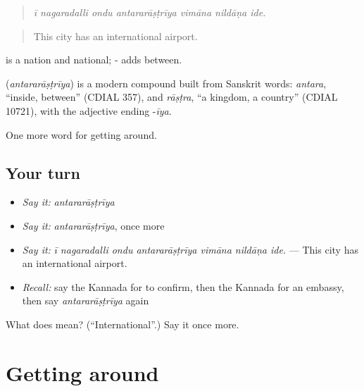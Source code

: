 \begin{quote}
\emph{ī nagaradalli ondu antararāṣṭrīya vimāna nildāṇa ide.}
\end{quote}

\begin{quote}
This city has an international airport.
\end{quote}

 is a nation and  national; - adds between.

\begin{cousinweb}
\textbf{} (\emph{antararāṣṭrīya}) is a modern compound built from Sanskrit words: \emph{antara}, \textquotedblleft{}inside, between\textquotedblright{} (CDIAL 357), and \emph{rāṣṭra}, \textquotedblleft{}a kingdom, a country\textquotedblright{} (CDIAL 10721), with the adjective ending -\emph{īya}.
\end{cousinweb}

\begin{grammarlens}[title={What you've built}]
One more word for getting around.
\end{grammarlens}

\subsection*{Your turn}
\begin{itemize}
\raggedright
  \item \emph{Say it:} \emph{antararāṣṭrīya}
  \item \emph{Say it:} \emph{antararāṣṭrīya}, once more
  \item \emph{Say it:} \emph{ī nagaradalli ondu antararāṣṭrīya vimāna nildāṇa ide.} — This city has an international airport.
  \item \emph{Recall:} say the Kannada for to confirm, then the Kannada for an embassy, then say \emph{antararāṣṭrīya} again
\end{itemize}

\begin{tcolorbox}[breakable,colback=teal!4,colframe=teal!35!black,title={Before you move on}]
What does  mean? (\textquotedblleft{}International\textquotedblright{}.) Say it once more.
\end{tcolorbox}
\section[(dialogue)]{Getting around}

